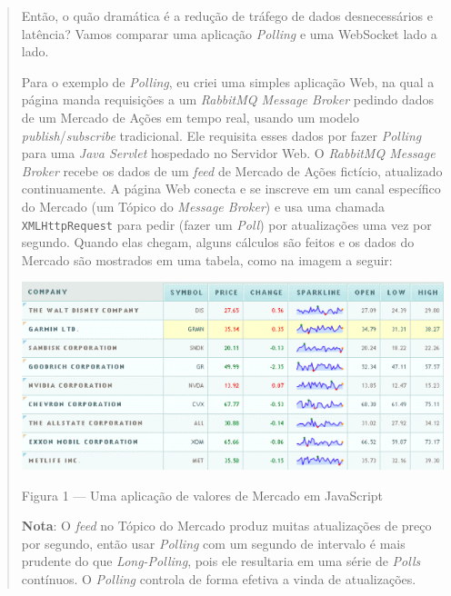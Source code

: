 \documentclass[a4paper,12pt]{article}
\newcommand{\code}[1]{\lstinline[mathescape=true, columns=fixed, basicstyle={\small\ttfamily}]{#1}}
\begin{document}
\begin{quotation}
Então, o quão dramática é a redução de tráfego de dados desnecessários e latência? Vamos comparar uma aplicação \emph{Polling} e uma WebSocket lado a lado.


Para o exemplo de \emph{Polling}, eu criei uma simples aplicação Web, na qual a página manda requisições a um \emph{RabbitMQ Message Broker} pedindo dados de um Mercado de Ações em tempo real, usando um modelo \emph{publish}/\emph{subscribe} tradicional. Ele requisita esses dados por fazer \emph{Polling} para uma \emph{Java Servlet} hospedado no Servidor Web. O \emph{RabbitMQ Message Broker} recebe os dados de um \emph{feed} de Mercado de Ações fictício, atualizado continuamente. A página Web conecta e se inscreve em um canal específico do Mercado (um Tópico do \emph{Message Broker}) e usa uma chamada \code{XMLHttpRequest} para pedir (fazer um \emph{Poll}) por atualizações uma vez por segundo. Quando elas chegam, alguns cálculos são feitos e os dados do Mercado são mostrados em uma tabela, como na imagem a seguir:

\includegraphics[width=1\linewidth]{images/stock-ticker.png}


Figura 1 — Uma aplicação de valores de Mercado em JavaScript

\textbf{Nota}: O \emph{feed} no Tópico do Mercado produz muitas atualizações de preço por segundo, então usar \emph{Polling} com um segundo de intervalo é mais prudente do que \emph{Long-Polling}, pois ele resultaria em uma série de \emph{Polls} contínuos. O \emph{Polling} controla de forma efetiva a vinda de atualizações.


\end{quotation}
\end{document}
